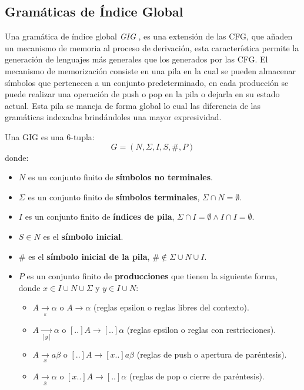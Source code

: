 \documentclass{article}
\begin{document}
\subsection{Gramáticas de Índice Global}

Una gramática de índice global \textit{GIG} \cite{globalIndexLanguages}, es una extensión de las CFG, que añaden un mecanismo 
de memoria al proceso de derivación, esta característica permite la generación de lenguajes más generales que los generados por las CFG.
El mecanismo de memorización consiste en una pila en la cual se pueden almacenar símbolos que pertenecen a un conjunto predeterminado,
en cada producción se puede realizar una operación de push o pop en la pila o dejarla en su estado actual. Esta pila se maneja de forma global
lo cual las diferencia de las gramáticas indexadas \cite{globalIndexLanguages} brindándoles una mayor expresividad. 

Una GIG es una 6-tupla:
$$
      G = (N, \Sigma, I, S, \#, P) 
$$
donde:

\begin{itemize}
      \item $N$ es un conjunto finito de \textbf{símbolos no terminales}.
      \item \( \Sigma \) es un conjunto finito de \textbf{símbolos terminales}, $\Sigma \cap N=\emptyset$.
      \item $I$ es un conjunto finito de \textbf{índices de pila}, $\Sigma \cap I=\emptyset \wedge I \cap I=\emptyset$.
      \item $S\in N$ es el \textbf{símbolo inicial}.
      \item $\#$ es el \textbf{símbolo inicial de la pila}, $\# \notin \Sigma \cup N \cup I$.
      \item $P$ es un conjunto finito de \textbf{producciones} que tienen la siguiente forma, donde $x\in I\cup N\cup \Sigma$ y $y\in I\cup N$:
            \begin{itemize}
                  \item $A \underset{\varepsilon}{\to} \alpha$ o $A \to \alpha$ (reglas epsilon o reglas libres del contexto).
                  \item $A \underset{[y]}{\to}  \alpha$ o $[..]A \to [..]\alpha$ (reglas epsilon o reglas con restricciones).
                  \item $A \underset{x}{\to} a \beta$ o $[..]A \to  [x..]a\beta$ (reglas de push o apertura de paréntesis).
                  \item $A \underset{\overline{x}}{\to} \alpha$ o $[x..]A \to [..]\alpha$ (reglas de pop o cierre de paréntesis).
            \end{itemize}
\end{itemize}
\end{document}
